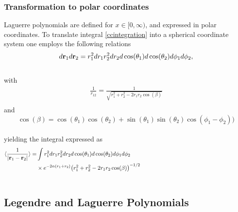 \documentclass[%
reprint,nofootinbib,
amsmath,amssymb,
aps,
]{revtex4-1}
\begin{document}
\subsubsection{Transformation to polar coordinates}  \noindent 
Laguerre polynomials are defined for $x\in[0,\infty)$, and expressed in polar coordinates. To translate integral \ref{ccintegration} into a spherical coordinate system one employs the following relations\vspace{2mm} \\
\begin{equation}\label{r1r2}
	d{\bf r}_1d{\bf r}_2  = r_1^2dr_1 r_2^2dr_2 d\cos(\theta_1)d\cos(\theta_2)d\phi_1d\phi_2,
\end{equation}\vspace{2mm}\\
with \vspace{2mm}\\
\begin{align}\label{r12}
	\frac{1}{r_{12}}= \frac{1}{\sqrt{r_1^2+r_2^2-2r_1r_2\cos(\beta)}} \nonumber \\
\end{align} \vspace{2mm}
and \vspace{2mm}\\
\begin{equation*}
	\cos(\beta) = \cos(\theta_1)\cos(\theta_2)+\sin(\theta_1)\sin(\theta_2)\cos(\phi_1-\phi_2))
\end{equation*}\vspace{2mm}\\
yielding the integral expressed as \vspace{2mm} \\
\begin{align}\label{cpintegration}
	\langle \frac{1}{\abs{{\bf r}_1-{\bf r}_2}} \rangle = &\int r_1^2dr_1 r_2^2dr_2 d\cos(\theta_1)d\cos(\theta_2)d\phi_1d\phi_2  \nonumber \hspace{73mm}  \\ 
	&\times e^{-2\alpha (r_1+r_2)}\qty(r_1^2+r_2^2-2r_1r_2\cos(\beta))^{-1/2} \nonumber  \hspace{35mm} \\ &\nonumber \\
\end{align}


\subsection{Legendre and Laguerre Polynomials}
\end{document}
